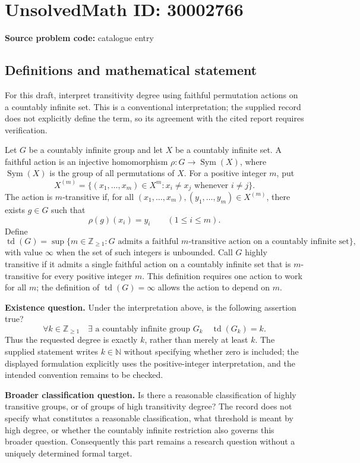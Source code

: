 \documentclass[11pt]{article}
\begin{document}
\section*{UnsolvedMath ID: 30002766}
\textbf{Source problem code:} catalogue entry
\subsection{Definitions and mathematical statement}
For this draft, interpret transitivity degree using faithful permutation actions on a countably infinite set. This is a conventional interpretation; the supplied record does not explicitly define the term, so its agreement with the cited report requires verification.

Let \(G\) be a countably infinite group and let \(X\) be a countably infinite set. A faithful action is an injective homomorphism \(\rho:G\to\operatorname{Sym}(X)\), where \(\operatorname{Sym}(X)\) is the group of all permutations of \(X\). For a positive integer \(m\), put
\[
X^{(m)}=\{(x_1,\ldots,x_m)\in X^m:x_i\ne x_j\text{ whenever }i\ne j\}.
\]
The action is \(m\)-transitive if, for all \((x_1,\ldots,x_m),(y_1,\ldots,y_m)\in X^{(m)}\), there exists \(g\in G\) such that
\[
\rho(g)(x_i)=y_i\qquad(1\le i\le m).
\]
Define
\[
\operatorname{td}(G)=\sup\bigl\{m\in\mathbb Z_{\ge1}:G\text{ admits a faithful }m\text{-transitive action on a countably infinite set}\bigr\},
\]
with value \(\infty\) when the set of such integers is unbounded. Call \(G\) highly transitive if it admits a single faithful action on a countably infinite set that is \(m\)-transitive for every positive integer \(m\). This definition requires one action to work for all \(m\); the definition of \(\operatorname{td}(G)=\infty\) allows the action to depend on \(m\).

\textbf{Existence question.} Under the interpretation above, is the following assertion true?
\[
\forall k\in\mathbb Z_{\ge1}\quad\exists\text{ a countably infinite group }G_k
\quad\operatorname{td}(G_k)=k.
\]
Thus the requested degree is exactly \(k\), rather than merely at least \(k\). The supplied statement writes \(k\in\mathbb N\) without specifying whether zero is included; the displayed formulation explicitly uses the positive-integer interpretation, and the intended convention remains to be checked.

\textbf{Broader classification question.} Is there a reasonable classification of highly transitive groups, or of groups of high transitivity degree? The record does not specify what constitutes a reasonable classification, what threshold is meant by high degree, or whether the countably infinite restriction also governs this broader question. Consequently this part remains a research question without a uniquely determined formal target.
\end{document}
